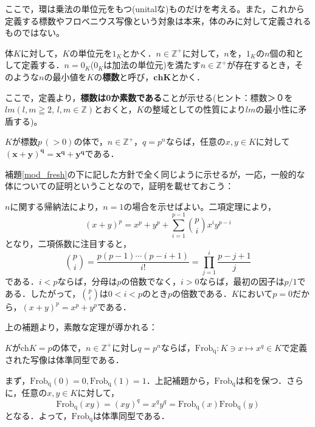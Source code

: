 ここで，環は乗法の単位元をもつ(unitalな)ものだけを考える。また，これから定義する標数やフロベニウス写像という対象は本来，体のみに対して定義されるものではない。

\begin{dfn}[体の標数]\label{ch_def}
    体$K$に対して，$K$の単位元を$1_K$とかく．$n \in \mathbb{Z^{+}}$に対して，$n$を，$1_K$の$n$個の和として定義する．$n=0_K$($0_K$は加法の単位元)を満たす$n \in \mathbb{Z^{+}}$が存在するとき，そのような$n$の最小値を$K$の\textbf{標数}と呼び，$\mathbf{ch}\boldsymbol{K}$とかく．
\end{dfn}

ここで，定義より，\textbf{標数は0か素数である}ことが示せる(ヒント：標数＞０を$lm\left(l,m\geqq 2, \, l,m \in \mathbb{Z}\right)$とおくと，$K$の整域としての性質により$lm$の最小性に矛盾する)。

\begin{lemma}[\textsf{FD}]\label{ch_fresh}
    $K$が標数$p\, (>0)$の体で，$n \in \mathbb{Z^{+}}$，$q=p^n$ならば，任意の$x,y \in K$に対して$\boldsymbol{(x+y)^{q}=x^q+y^q}$である．
\end{lemma}

補題\ref{mod_fresh}の下に記した方針で全く同じように示せるが，一応，一般的な体についての証明ということなので，証明を載せておこう：

\begin{prf}
    $n$に関する帰納法により，$n=1$の場合を示せばよい。二項定理により，
    \[
    (x+y)^p=x^p+y^p+\sum_{i=1}^{p-1}\binom{p}{i}x^i y^{p-i}
    \]
    となり，二項係数に注目すると，
    \[
    \binom{p}{i}=\frac{p(p-1)\cdots(p-i+1)}{i!}=\prod_{j=1}^{i}\frac{p-j+1}{j}
    \]
    である．$i<p$ならば，分母は$p$の倍数でなく，$i>0$ならば，最初の因子は$p/1$である．したがって，$\binom{p}{i}$は$0<i<p$のとき$p$の倍数である．$K$において$p=0$だから，$(x+y)^p=x^p+y^p$である．
\end{prf}

上の補題より，素敵な定理が導かれる：

\begin{thm}
    $K$が$\mathrm{ch}K=p$の体で，$n \in \mathbb{Z}^{+}$に対し$q=p^n$ならば，$\mathrm{Frob_q}:K \ni x \mapsto x^q \in K$で定義された写像は体準同型である．
\end{thm}

\begin{prf}
    まず，$\mathrm{Frob_q}(0)=0,\mathrm{Frob_q}(1)=1$．上記補題から，$\mathrm{Frob_q}$は和を保つ．さらに，任意の$x,y \in K$に対して，
    \[
    \mathrm{Frob_q}(xy)=(xy)^q=x^q y^q=\mathrm{Frob_q}(x)\mathrm{Frob_q}(y)
    \]
    となる．よって，$\mathrm{Frob_q}$は体準同型である．
\end{prf}

